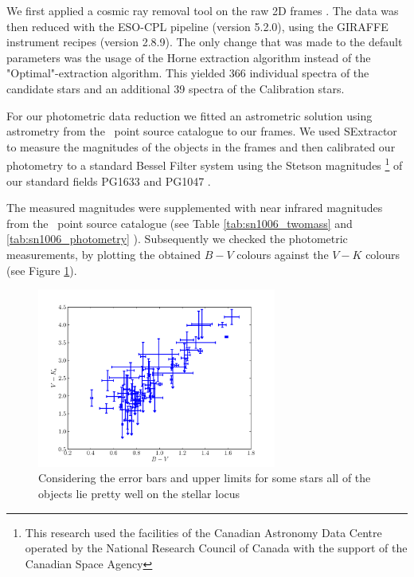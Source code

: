 We first applied a cosmic ray removal tool on the raw 2D frames \citep{2001PASP..113.1420V}. The data was then reduced with the ESO-CPL pipeline (version 5.2.0), using the GIRAFFE instrument recipes (version 2.8.9). The only change that was made to the default parameters was the usage of the Horne extraction algorithm instead of the "Optimal"-extraction algorithm. This yielded 366 individual spectra of the candidate stars and an additional 39 spectra of the Calibration stars. 

For our photometric data reduction we fitted an astrometric solution using astrometry from the \twomass\ point source catalogue \citep{2006AJ....131.1163S} to our frames. 
We used SExtractor \citep{1996A&AS..117..393B} to measure the magnitudes of the objects in the frames and then calibrated our photometry to a standard Bessel Filter system using the Stetson magnitudes \footnote{This research used the facilities of the Canadian Astronomy Data Centre operated by the National Research Council of Canada with the support of the Canadian Space Agency}  of our standard fields PG1633 and PG1047 .  

The measured magnitudes were supplemented with near infrared magnitudes from the \twomass\ point source catalogue (see Table \ref{tab:sn1006_twomass} and \ref{tab:sn1006_photometry} ). Subsequently we checked the photometric measurements, by plotting the obtained $B-V$ colours against the $V-K$ colours (see Figure \ref{fig:colour_check}).
\begin{figure}[htbp] %
   \centering
   \includegraphics[width=0.7\textwidth]{chapter_sn1006/plots/color_bv_vk.pdf} 
   \caption{Considering the error bars and upper limits for some stars all of the objects lie pretty well on the stellar locus}
   \label{fig:colour_check}
\end{figure}

